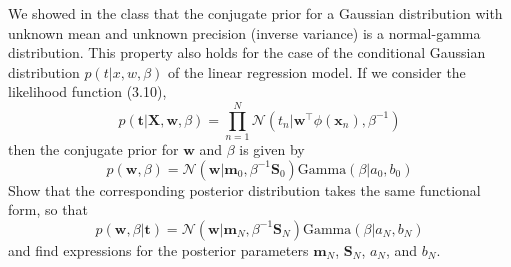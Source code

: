 \documentclass{article}
\begin{document}
We showed in the class that the conjugate prior for a Gaussian distribution with unknown mean 
and unknown precision (inverse variance) is a normal-gamma distribution. This property also holds for the 
case of the conditional Gaussian distribution $p(t|x,w,\beta)$ of the linear regression model. If we consider the 
likelihood function (3.10), 
\begin{equation}
    p(\mathbf{t}|\mathbf{X},\mathbf{w},\beta) = \prod_{n=1}^N \mathcal{N}(t_n|\mathbf{w}^\top\phi(\mathbf{x}_n),\beta^{-1})
\end{equation}
then the conjugate prior for $\mathbf{w}$ and $\beta$ is given by 
\begin{equation}
    p(\mathbf{w}, \beta) = \mathcal{N}(\mathbf{w}|\mathbf{m}_0,\beta^{-1} \mathbf{S}_0)\text{Gamma}(\beta|a_0,b_0)
\end{equation}
Show that the corresponding posterior distribution takes the same functional form, so that 
\begin{equation}
    p(\mathbf{w}, \beta|\mathbf{t}) = \mathcal{N}(\mathbf{w}|\mathbf{m}_N,\beta^{-1} \mathbf{S}_N)\text{Gamma}(\beta|a_N,b_N)
\end{equation}
and find expressions for the posterior parameters $\mathbf{m}_N$, $\mathbf{S}_N$, $a_N$, and $b_N$. 
\color{blue}
\end{document}
